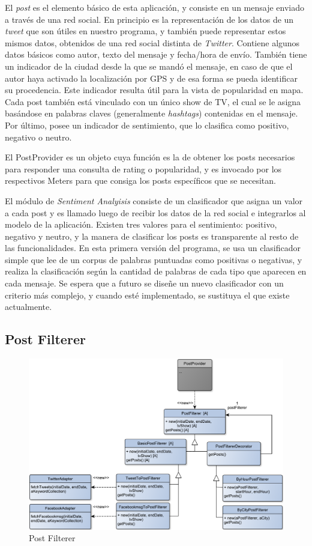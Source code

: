 El \emph{post} es el elemento básico de esta aplicación, y consiste en un mensaje enviado a través de una red social. En principio es la representación de los datos de un \emph{tweet} que son útiles en nuestro programa, y también puede representar estos mismos datos, obtenidos de una red social distinta de \emph{Twitter}. Contiene algunos datos básicos como autor, texto del mensaje y fecha/hora de envío. También tiene un indicador de la ciudad desde la que se mandó el mensaje, en caso de que el autor haya activado la localización por GPS y de esa forma se pueda identificar su procedencia. Este indicador resulta útil para la vista de popularidad en mapa. Cada post también está vinculado con un único show de TV, el cual se le asigna basándose en palabras claves (generalmente \emph{hashtags}) contenidas en el mensaje. Por último, posee un indicador de sentimiento, que lo clasifica como positivo, negativo o neutro.
\medskip

El PostProvider es un objeto cuya función es la de obtener los posts necesarios para responder una consulta de rating o popularidad, y es invocado por los respectivos Meters para que consiga los posts específicos que se necesitan.
\medskip

El módulo de \emph{Sentiment Analyisis} consiste de un clasificador que asigna un valor a cada post y es llamado luego de recibir los datos de la red social e integrarlos al modelo de la aplicación. Existen tres valores para el sentimiento: positivo, negativo y neutro, y la manera de clasificar los posts es transparente al resto de las funcionalidades. En esta primera versión del programa, se usa un clasificador simple que lee de un corpus de palabras puntuadas como positivas o negativas, y realiza la clasificación según la cantidad de palabras de cada tipo que aparecen en cada mensaje. Se espera que a futuro se diseñe un nuevo clasificador con un criterio más complejo, y cuando esté implementado, se sustituya el que existe actualmente.


\subsection{Post Filterer}

\begin{figure}[H]
\centering
\includegraphics[width=\textwidth]{graph/clase/filterer.pdf}
\caption{Post Filterer}
\end{figure}

